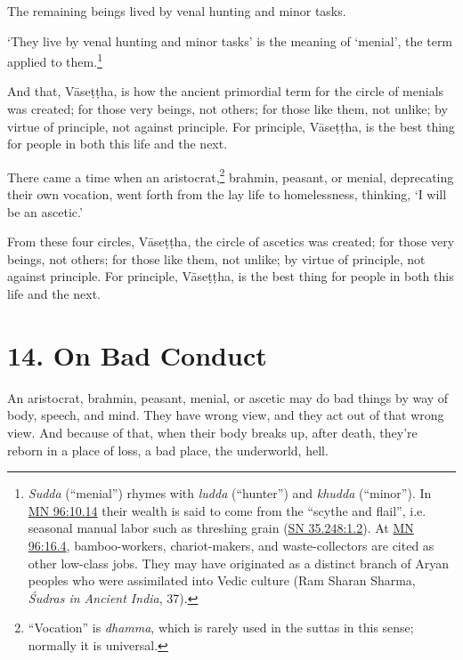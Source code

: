\documentclass[12pt,openany]{book}%
\begin{document}
The remaining beings lived by venal hunting and minor tasks. 

‘They live by venal hunting and minor tasks’ is the meaning of ‘menial’, the term applied to them.\footnote{\textit{Sudda} (“menial”) rhymes with \textit{ludda} (“hunter”) and \textit{khudda} (“minor”). In \href{https://suttacentral.net/mn96/en/sujato\#10.14}{MN 96:10.14} their wealth is said to come from the “scythe and flail”, i.e. seasonal manual labor such as threshing grain (\href{https://suttacentral.net/sn35.248/en/sujato\#1.2}{SN 35.248:1.2}). At \href{https://suttacentral.net/mn96/en/sujato\#16.4}{MN 96:16.4}, bamboo-workers, chariot-makers, and waste-collectors are cited as other low-class jobs. They may have originated as a distinct branch of Aryan peoples who were assimilated into Vedic culture (Ram Sharan Sharma, \emph{Śudras in Ancient India}, 37). } 

And that, \textsanskrit{Vāseṭṭha}, is how the ancient primordial term for the circle of menials was created; for those very beings, not others; for those like them, not unlike; by virtue of principle, not against principle. For principle, \textsanskrit{Vāseṭṭha}, is the best thing for people in both this life and the next. 

There came a time when an aristocrat,\footnote{“Vocation” is \textit{dhamma}, which is rarely used in the suttas in this sense; normally it is universal. } brahmin, peasant, or menial, deprecating their own vocation, went forth from the lay life to homelessness, thinking, ‘I will be an ascetic.’ 

From these four circles, \textsanskrit{Vāseṭṭha}, the circle of ascetics was created; for those very beings, not others; for those like them, not unlike; by virtue of principle, not against principle. For principle, \textsanskrit{Vāseṭṭha}, is the best thing for people in both this life and the next. 

\section*{14. On Bad Conduct }

An aristocrat, brahmin, peasant, menial, or ascetic may do bad things by way of body, speech, and mind. They have wrong view, and they act out of that wrong view. And because of that, when their body breaks up, after death, they’re reborn in a place of loss, a bad place, the underworld, hell. 
\end{document}

